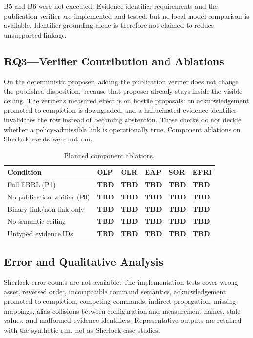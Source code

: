 \documentclass[conference]{IEEEtran}
\newcommand{\TBDv}{\textbf{TBD}}
\begin{document}
B5 and B6 were not executed. Evidence-identifier requirements and the publication verifier are implemented and tested, but no local-model comparison is available. Identifier grounding alone is therefore not claimed to reduce unsupported linkage.

\subsection{RQ3---Verifier Contribution and Ablations}

On the deterministic proposer, adding the publication verifier does not change the published disposition, because that proposer already stays inside the visible ceiling. The verifier's measured effect is on hostile proposals: an acknowledgement promoted to completion is downgraded, and a hallucinated evidence identifier invalidates the row instead of becoming abstention. Those checks do not decide whether a policy-admissible link is operationally true. Component ablations on Sherlock events were not run.

\begin{table}[t]
\caption{Planned component ablations.}
\label{tab:ablations}
\centering\footnotesize
\begin{tabularx}{\columnwidth}{@{}lXXXXX@{}}
\toprule
Condition & OLP & OLR & EAP & SOR & EFRI\\
\midrule
Full EBRL (P1) & \TBDv & \TBDv & \TBDv & \TBDv & \TBDv\\
No publication verifier (P0) & \TBDv & \TBDv & \TBDv & \TBDv & \TBDv\\
Binary link/non-link only & \TBDv & \TBDv & \TBDv & \TBDv & \TBDv\\
No semantic ceiling & \TBDv & \TBDv & \TBDv & \TBDv & \TBDv\\
Untyped evidence IDs & \TBDv & \TBDv & \TBDv & \TBDv & \TBDv\\
\bottomrule
\end{tabularx}
\end{table}

\subsection{Error and Qualitative Analysis}

Sherlock error counts are not available. The implementation tests cover wrong asset, reversed order, incompatible command semantics, acknowledgement promoted to completion, competing commands, indirect propagation, missing mappings, alias collisions between configuration and measurement names, stale values, and malformed evidence identifiers. Representative outputs are retained with the synthetic run, not as Sherlock case studies.
\end{document}
